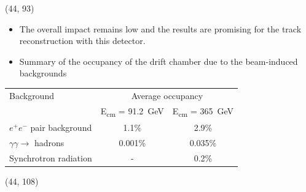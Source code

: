 \documentclass[final,xcolor={dvipsnames,svgnames,x11names,table}]{beamer}
\begin{document}
\begin{frame}
\begin{textblock}{43}
\begin{tcolorbox}[title=Beam-induced backgrounds and the impact on the drift chamber]
\begin{columns}
  \end{columns}

  \end{tcolorbox}
\end{textblock}

 \begin{textblock}{39.5}(44, 93)
   \begin{tcolorbox}[title=Conclusions]

   \begin{itemize}
     \item The overall impact remains low and the results are promising for the track reconstruction with this detector.
     \item Summary of the occupancy of the drift chamber due to the beam-induced backgrounds
   \end{itemize}
   \centering
   \begin{adjustbox}{max width=\textwidth}
     \begin{tabular}{l c c}
       \toprule
        Background & \multicolumn{2}{c}{Average occupancy} \\
         & E\textsubscript{cm} = 91.2~GeV &  E\textsubscript{cm} = 365~GeV \\
        \midrule
        $e^+e^-$ pair background & 1.1\% & 2.9\% \\
        $\gamma\gamma\rightarrow$ hadrons & 0.001\% & 0.035\%  \\
        Synchrotron radiation & - & 0.2\% \\
        \bottomrule
     \end{tabular}
   \end{adjustbox}



  \end{tcolorbox}
 \end{textblock}

 \begin{textblock}{39.5}(44, 108)
   \begin{tcolorbox}[title=References]

   \printbibliography

  \end{tcolorbox}
 \end{textblock}

\end{frame}
\end{document}
